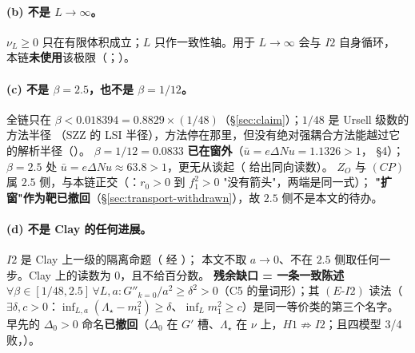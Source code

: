 \paragraph{(b) 不是 $L\to\infty$。}\LC{} $\nu_L\ge0$ 只在有限体积成立；$L$ 只作一致性轴。用于 $L\to\infty$ 会与 $I2$ 自身循环，
本链\textbf{未使用}该极限（；）。

\paragraph{(c) 不是 $\beta=2.5$，也不是 $\beta=1/12$。}\LT{} 全链只在 $\beta<0.018394=0.8829\times(1/48)$（\S\ref{sec:claim}）；$1/48$ 是 Ursell 级数的方法半径
（SZZ 的 LSI 半径），方法停在那里，但没有绝对强耦合方法能越过它的解析半径（）。
$\beta=1/12=0.0833$ \textbf{已在窗外}（$\bar u=e\Delta Nu=1.1326>1$， \S4）；
$\beta=2.5$ 处 $\bar u=e\Delta Nu\approx63.8>1$，更无从谈起（ 给出同向读数）。
$Z_O$ 与 $(CP)$ 属 $2.5$ 侧，与本链正交（：$r_0>0$ 到 $f_1^2>0$ "没有箭头"，两端是同一式）；
\textbf{"扩窗"作为靶已撤回}（\S\ref{sec:transport-withdrawn}），故 $2.5$ 侧不是本文的待办。

\paragraph{(d) 不是 Clay 的任何进展。}\LT{} $I2$ 是 Clay 上一级的隔离命题（ 经 ）；
本文不取 $a\to0$、不在 $2.5$ 侧取任何一步。Clay 上的读数为 0，且不给百分数。
\textbf{残余缺口 = 一条一致陈述} $\forall\beta\in[1/48,2.5]\,\forall L,a:G''_{k=0}/a^2\ge\delta^2>0$（C5 的量词形）；其 $(E\text{-}I2)$ 读法（$\exists\delta,c>0$：$\inf_{L,a}(\Lambda_\star-m_1^2)\ge\delta$、$\inf_L m_1^2\ge c$）是同一等价类的第三个名字。早先的 $\Delta_0>0$ 命名\textbf{已撤回}（$\Delta_0$ 在 $G'$ 槽、$\Lambda_\star$ 在 $\nu$ 上，$H1\not\Rightarrow I2$；且四模型 3/4 败，）。\LM

